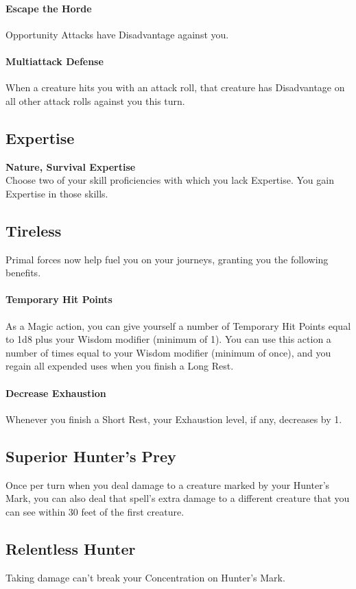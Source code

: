 \documentclass[letterpaper,openany,oneside,twocolumn]{book}
\begin{document}
\paragraph*{Escape the Horde} Opportunity Attacks have Disadvantage against you.

\paragraph*{Multiattack Defense} When a creature hits you with an attack roll, that creature has Disadvantage on all other attack rolls against you this turn.
\subsection*{Expertise}
\textbf{Nature, Survival Expertise}\\
Choose two of your skill proficiencies with which you lack Expertise. You gain Expertise in those skills.
\subsection*{Tireless}
Primal forces now help fuel you on your journeys, granting you the following benefits.

\paragraph*{Temporary Hit Points} As a Magic action, you can give yourself a number of Temporary Hit Points equal to 1d8 plus your Wisdom modifier (minimum of 1). You can use this action a number of times equal to your Wisdom modifier (minimum of once), and you regain all expended uses when you finish a Long Rest.

\paragraph*{Decrease Exhaustion} Whenever you finish a Short Rest, your Exhaustion level, if any, decreases by 1.
\subsection*{Superior Hunter's Prey}
Once per turn when you deal damage to a creature marked by your Hunter's Mark, you can also deal that spell's extra damage to a different creature that you can see within 30 feet of the first creature.
\subsection*{Relentless Hunter}
Taking damage can't break your Concentration on Hunter's Mark.
\end{document}
